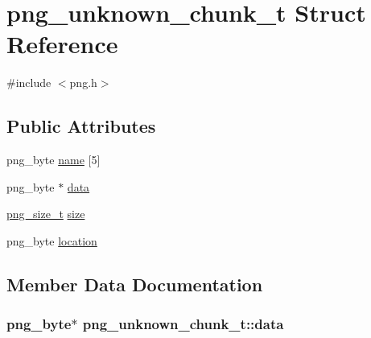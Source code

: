 \hypertarget{structpng__unknown__chunk__t}{}\section{png\+\_\+unknown\+\_\+chunk\+\_\+t Struct Reference}
\label{structpng__unknown__chunk__t}


{\ttfamily \#include $<$png.\+h$>$}

\subsection*{Public Attributes}
\begin{DoxyCompactItemize}
\item 
png\+\_\+byte \hyperlink{structpng__unknown__chunk__t_aed965186b30a6f15541d20d7dd8a6849}{name} \mbox{[}5\mbox{]}
\item 
png\+\_\+byte $\ast$ \hyperlink{structpng__unknown__chunk__t_a4f37f6acbe4e2c287078bcdf03d8ee92}{data}
\item 
\hyperlink{pngconf_8h_a975e35d0a699ea3b08b8feef90fd29eb}{png\+\_\+size\+\_\+t} \hyperlink{structpng__unknown__chunk__t_a0a691245e0c04f01ecf767f215b6a652}{size}
\item 
png\+\_\+byte \hyperlink{structpng__unknown__chunk__t_af56bfc32223b97fbcb6bd29ba7a1cc29}{location}
\end{DoxyCompactItemize}


\subsection{Member Data Documentation}
\hypertarget{structpng__unknown__chunk__t_a4f37f6acbe4e2c287078bcdf03d8ee92}{}
\subsubsection[{data}]{\setlength{\rightskip}{0pt plus 5cm}png\+\_\+byte$\ast$ png\+\_\+unknown\+\_\+chunk\+\_\+t\+::data}\label{structpng__unknown__chunk__t_a4f37f6acbe4e2c287078bcdf03d8ee92}
\hypertarget{structpng__unknown__chunk__t_af56bfc32223b97fbcb6bd29ba7a1cc29}{}
